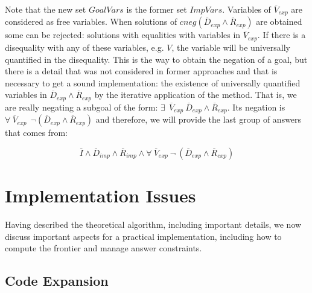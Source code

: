 \documentclass{llncs}
\begin{document}
\begin{itemize}
           Note that the new set $GoalVars$ is the former set
           $ImpVars$. Variables of $\overline{V}_{exp}$ are considered
           as free variables. When solutions of
           $cneg(\overline{D}_{exp} \wedge \overline{R}_{exp})$ are
           obtained some can be rejected: solutions with equalities
           with variables in $\overline{V}_{exp}$. If there is a
           disequality with any of these variables, e.g. $V$, the
           variable will be universally quantified in the disequality.
           This is the way to obtain the negation of a goal, but there
           is a detail that was not considered in former approaches
           and that is necessary to get a sound implementation: the
           existence of universally quantified variables in
           $\overline{D}_{exp} \wedge \overline{R}_{exp}$ by the
           iterative application of the method. That is, we are really
           negating a subgoal of the form: $ \exists~~
           \overline{V}_{exp}~ \overline{D}_{exp} \wedge
           \overline{R}_{exp}$. Its negation is $\forall~
           \overline{V}_{exp}~~ \neg(\overline{D}_{exp} \wedge
           \overline{R}_{exp})$ and therefore, we will provide the
           last group of answers that comes from:

           \[\overline{I} \wedge \overline{D}_{imp}
           \wedge \overline{R}_{imp} \wedge \forall~
           \overline{V}_{exp}~ \neg~(\overline{D}_{exp} \wedge
           \overline{R}_{exp})\]

         \end{itemize}


    


\section{Implementation Issues}
\label{implementation}

Having described the theoretical algorithm, including important
details, we now discuss important aspects for a practical
implementation, including how to compute the frontier and manage
answer constraints.


\subsection{Code Expansion}
\label{expansion}
\end{document}
